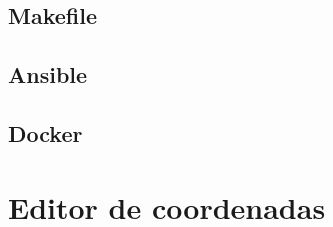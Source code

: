 \subsection{Makefile}

\subsection{Ansible}

\subsection{Docker}



\section{Editor de coordenadas}

